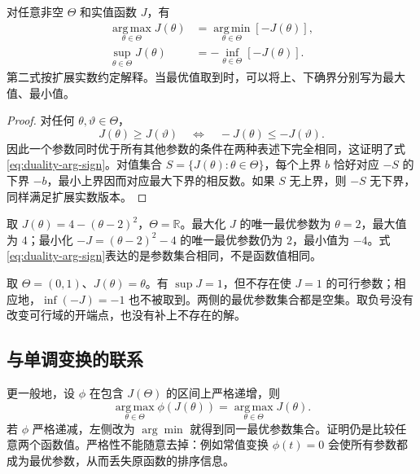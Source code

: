 \documentclass[UTF8]{ctexart}
\begin{document}
\begin{theorem}[目标取负的等价性]
\label{thm:duality-sign}
对任意非空 $\Theta$ 和实值函数 $J$，有
\begin{align}
 \operatorname*{arg\,max}_{\theta\in\Theta}J(\theta)
 &=\operatorname*{arg\,min}_{\theta\in\Theta}[-J(\theta)],
 \label{eq:duality-arg-sign}\\
 \sup_{\theta\in\Theta}J(\theta)
 &=-\inf_{\theta\in\Theta}[-J(\theta)].
 \label{eq:duality-value-sign}
\end{align}
第二式按扩展实数约定解释。当最优值取到时，可以将上、下确界分别写为最大值、最小值。
\end{theorem}
\begin{proof}
对任何 $\theta,\vartheta\in\Theta$，
\[
 J(\theta)\geq J(\vartheta)
 \quad\Longleftrightarrow\quad
 -J(\theta)\leq-J(\vartheta).
\]
因此一个参数同时优于所有其他参数的条件在两种表述下完全相同，这证明了式\eqref{eq:duality-arg-sign}。对值集合 $S=\{J(\theta):\theta\in\Theta\}$，每个上界 $b$ 恰好对应 $-S$ 的下界 $-b$，最小上界因而对应最大下界的相反数。如果 $S$ 无上界，则 $-S$ 无下界，同样满足扩展实数版本。
\end{proof}

\begin{example}
取 $J(\theta)=4-(\theta-2)^2$，$\Theta=\mathbb R$。最大化 $J$ 的唯一最优参数为 $\theta=2$，最大值为 $4$；最小化 $-J=(\theta-2)^2-4$ 的唯一最优参数仍为 $2$，最小值为 $-4$。式\eqref{eq:duality-arg-sign}表达的是参数集合相同，不是函数值相同。
\end{example}

\begin{example}[等价变换不会创造最优解]
取 $\Theta=(0,1)$、$J(\theta)=\theta$。有 $\sup J=1$，但不存在使 $J=1$ 的可行参数；相应地，$\inf(-J)=-1$ 也不被取到。两侧的最优参数集合都是空集。取负号没有改变可行域的开端点，也没有补上不存在的解。
\end{example}

\subsection{与单调变换的联系}

更一般地，设 $\phi$ 在包含 $J(\Theta)$ 的区间上严格递增，则
\[
 \operatorname*{arg\,max}_{\theta\in\Theta}\phi(J(\theta))
 =\operatorname*{arg\,max}_{\theta\in\Theta}J(\theta).
\]
若 $\phi$ 严格递减，左侧改为 $\arg\min$ 就得到同一最优参数集合。证明仍是比较任意两个函数值。严格性不能随意去掉：例如常值变换 $\phi(t)=0$ 会使所有参数都成为最优参数，从而丢失原函数的排序信息。
\end{document}
